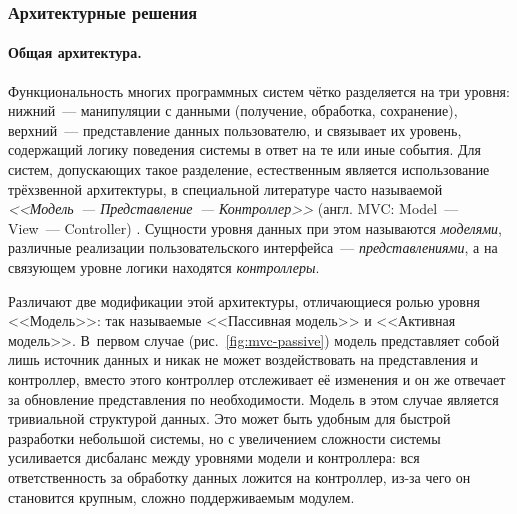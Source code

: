 \documentclass[a4paper, 14pt, titlepage]{extarticle}
\newcommand{\eng}[1]{\foreignlanguage{english}{#1}}
\newcommand{\term}[1]{\emph{#1}}
\begin{document}
  \subsubsection{Архитектурные решения}

  \paragraph{Общая архитектура.}
  Функциональность многих программных систем чётко разделяется на три уровня: нижний~---
  манипуляции с данными (получение, обработка, сохранение), верхний~--- представление данных
  пользователю, и связывает их уровень, содержащий логику поведения системы в ответ
  на те или иные события. Для систем, допускающих такое разделение, естественным является
  использование трёхзвенной архитектуры, в специальной литературе часто называемой
  \term{<<Модель~--- Представление~--- Контроллер>>} (англ. \eng{MVC: Model~--- View~--- Controller})
  \cite{gamma-patterns}. Сущности уровня данных при этом называются \term{моделями}, различные
  реализации пользовательского интерфейса~--- \term{представлениями}, а на связующем уровне логики
  находятся \term{контроллеры}.

  Различают две модификации этой архитектуры, отличающиеся ролью уровня <<Модель>>: так называемые
  <<Пассивная модель>> и <<Активная модель>>. В~первом случае (рис.~\ref{fig:mvc-passive}) модель
  представляет собой лишь источник данных и никак не может воздействовать на представления и
  контроллер, вместо этого контроллер отслеживает её изменения и он же отвечает за обновление
  представления по необходимости. Модель в этом случае является тривиальной структурой данных. Это
  может быть удобным для быстрой разработки небольшой системы, но с увеличением сложности системы
  усиливается дисбаланс между уровнями модели и контроллера: вся ответственность за обработку данных
  ложится на контроллер, из-за чего он становится крупным, сложно поддерживаемым модулем.
\end{document}
